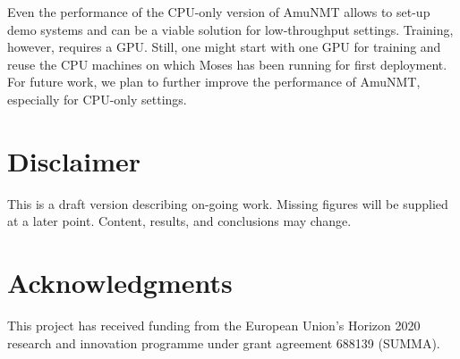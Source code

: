 \documentclass[11pt]{article}
\begin{document}
Even the performance of the CPU-only version of AmuNMT allows to set-up demo systems and can be a viable solution for low-throughput settings. Training, however, requires a GPU. Still, one might start with one GPU for training and reuse the CPU machines on which Moses has been running  for first deployment. For future work, we plan to further improve the performance of AmuNMT, especially for CPU-only settings.

\section*{Disclaimer}
This is a draft version describing on-going work. Missing figures will be supplied at a later point. Content, results, and conclusions may change. 

\section*{Acknowledgments}

This project has received funding from the European Union's Horizon 2020 research and innovation
programme under grant agreement 688139 (SUMMA).




\end{document}
